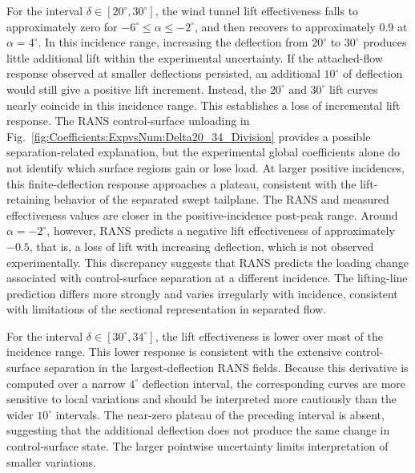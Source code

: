 \documentclass[journal ]{new-aiaa}
\begin{document}
For the interval \(\delta\in[20^\circ,30^\circ]\), the wind tunnel lift effectiveness falls to approximately zero for \(-6^\circ\leq\alpha\leq-2^\circ\), and then recovers to approximately \(0.9\) at \(\alpha=4^\circ\).
In this incidence range, increasing the deflection from \(20^\circ\) to \(30^\circ\) produces little additional lift within the experimental uncertainty.
If the attached-flow response observed at smaller deflections persisted, an additional \(10^\circ\) of deflection would still give a positive lift increment. Instead, the \(20^\circ\) and \(30^\circ\) lift curves nearly coincide in this incidence range. This establishes a loss of incremental lift response. The RANS control-surface unloading in Fig.~\ref{fig:Coefficients:ExpvsNum:Delta20_34_Division} provides a possible separation-related explanation, but the experimental global coefficients alone do not identify which surface regions gain or lose load.
At larger positive incidences, this finite-deflection response approaches a plateau, consistent with the lift-retaining behavior of the separated swept tailplane.
The RANS and measured effectiveness values are closer in the positive-incidence post-peak range.
Around \(\alpha=-2^\circ\), however, RANS predicts a negative lift effectiveness of approximately \(-0.5\), that is, a loss of lift with increasing deflection, which is not observed experimentally.
This discrepancy suggests that RANS predicts the loading change associated with control-surface separation at a different incidence. The lifting-line prediction differs more strongly and varies irregularly with incidence, consistent with limitations of the sectional representation in separated flow.

For the interval \(\delta\in[30^\circ,34^\circ]\), the lift effectiveness is lower over most of the incidence range.
This lower response is consistent with the extensive control-surface separation in the largest-deflection RANS fields.
Because this derivative is computed over a narrow \(4^\circ\) deflection interval, the corresponding curves are more sensitive to local variations and should be interpreted more cautiously than the wider \(10^\circ\) intervals.
The near-zero plateau of the preceding interval is absent, suggesting that the additional deflection does not produce the same change in control-surface state. The larger pointwise uncertainty limits interpretation of smaller variations.
\end{document}
